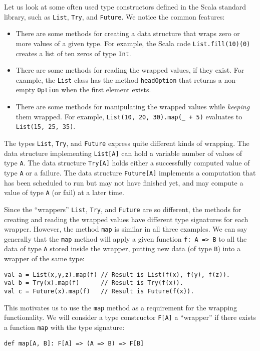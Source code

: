 Let us look at some often used type constructors defined in the Scala
standard library, such as \lstinline!List!, \lstinline!Try!, and
\lstinline!Future!. We notice the common features:
\begin{itemize}
\item There are some methods for creating a data structure that wraps zero
or more values of a given type. For example, the Scala code \lstinline!List.fill(10)(0)!
creates a list of ten zeros of type \lstinline!Int!.
\item There are some methods for reading the wrapped values, if they exist.
For example, the \lstinline!List! class has the method \lstinline!headOption!
that returns a non-empty \lstinline!Option! when the first element
exists.
\item There are some methods for manipulating the wrapped values while \emph{keeping}
them wrapped. For example, \lstinline!List(10, 20, 30).map(_ + 5)!
evaluates to \lstinline!List(15, 25, 35)!.
\end{itemize}
The types \lstinline!List!, \lstinline!Try!, and \lstinline!Future!
express quite different kinds of wrapping. The data structure implementing
\lstinline!List[A]! can hold a variable number of values of type
\lstinline!A!. The data structure \lstinline!Try[A]! holds either
a successfully computed value of type \lstinline!A! or a failure.
The data structure \lstinline!Future[A]! implements a computation
that has been scheduled to run but may not have finished yet, and
may compute a value of type \lstinline!A! (or fail) at a later time.

Since the \textsf{``}wrappers\textsf{''} \lstinline!List!, \lstinline!Try!, and
\lstinline!Future! are so different, the methods for creating and
reading the wrapped values have different type signatures for each
wrapper. However, the method \lstinline!map! is similar in all three
examples. We can say generally that the \lstinline!map! method will
apply a given function \lstinline!f: A => B! to all the data of type
\lstinline!A! stored inside the wrapper, putting new data (of type
\lstinline!B!) into a wrapper of the same type:
\begin{lstlisting}
val a = List(x,y,z).map(f) // Result is List(f(x), f(y), f(z)).
val b = Try(x).map(f)      // Result is Try(f(x)).
val c = Future(x).map(f)   // Result is Future(f(x)).
\end{lstlisting}
This motivates us to use the \lstinline!map! method as a requirement
for the wrapping functionality. We will consider a type constructor
\lstinline!F[A]! a \textsf{``}wrapper\textsf{''} if there exists a function \lstinline!map!
with the type signature:
\begin{lstlisting}
def map[A, B]: F[A] => (A => B) => F[B]
\end{lstlisting}


